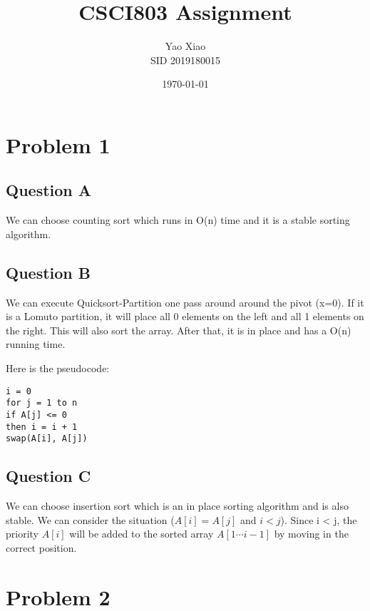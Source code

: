 \documentclass{article}
\title{CSCI803 Assignment}
\author{Yao Xiao \\ SID 2019180015}
\date{\today}
\begin{document}
\maketitle

\section{Problem 1}
\subsection{Question A}
We can choose counting sort which runs in O(n) time and it is a stable sorting algorithm. 

\subsection{Question B}
We can execute Quicksort-Partition one pass around around the pivot (x=0).
If it is a Lomuto partition, it will place all 0 elements on the left and all 1 elements on the right.
This will also sort the array.
After that, it is in place and has a O(n) running time.

Here is the pseudocode:
\begin{lstlisting}
i = 0
for j = 1 to n
if A[j] <= 0
then i = i + 1
swap(A[i], A[j])
\end{lstlisting}

\subsection{Question C}
We can choose insertion sort which is an in place sorting algorithm and is also stable.
We can consider the situation ($A[i] = A[j]$ and $i < j$).
Since i < j, the priority $A[i]$  will be added to the sorted array $A[1\cdots i-1]$ by moving in the correct position.


\section{Problem 2}
\end{document}
